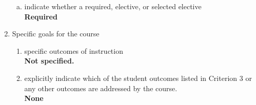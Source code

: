 \begin{enumerate}[1.]
\begin{enumerate}[a.]
\item indicate whether a required, elective, or selected elective\\ %
  {\bfseries
    Required
  }

\end{enumerate}

\item Specific goals for the course
\begin{enumerate}
\item specific outcomes of instruction\\ %
  {\bfseries
    Not specified.
  }

\item explicitly indicate which of the student outcomes listed in Criterion 3 or any other outcomes are addressed by the course.\\
  {\bfseries
    None
  }
\end{enumerate}


\end{enumerate}
